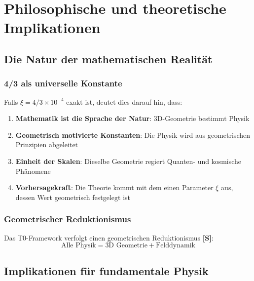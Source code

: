 	\section{Philosophische und theoretische Implikationen}
	\label{sec:philosophische_implikationen}
	
	\subsection{Die Natur der mathematischen Realität}
	\label{subsec:mathematische_realitaet}
	
	\subsubsection{4/3 als universelle Konstante}
	\label{subsubsec:vier_drittel_universell}
	
	Falls $\xi = 4/3 \times 10^{-4}$ exakt ist, deutet dies darauf hin, dass:
	
	\begin{enumerate}
		\item \textbf{Mathematik ist die Sprache der Natur}: 3D-Geometrie bestimmt Physik
		\item \textbf{Geometrisch motivierte Konstanten}: Die Physik wird aus geometrischen Prinzipien abgeleitet
		\item \textbf{Einheit der Skalen}: Dieselbe Geometrie regiert Quanten- und kosmische Phänomene
		\item \textbf{Vorhersagekraft}: Die Theorie kommt mit dem einen Parameter $\xi$ aus, dessen Wert geometrisch festgelegt ist
	\end{enumerate}
	
	\subsubsection{Geometrischer Reduktionismus}
	\label{subsubsec:geometrischer_reduktionismus}
	
	Das T0-Framework verfolgt einen geometrischen Reduktionismus \textbf{[S]}:
	\begin{equation}
		\boxed{\text{Alle Physik} = \text{3D Geometrie} + \text{Felddynamik}}
		\label{eq:ultimativer_reduktionismus}
	\end{equation}
	
	\subsection{Implikationen für fundamentale Physik}
	\label{subsec:fundamentale_physik}
	
